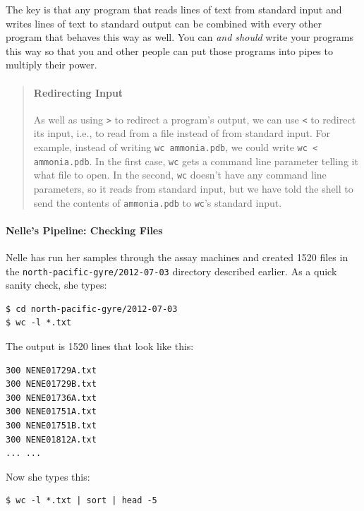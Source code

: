 \documentclass{book}
\begin{document}
The key is that any program that reads lines of text from standard input
and writes lines of text to standard output can be combined with every
other program that behaves this way as well. You can \emph{and should}
write your programs this way so that you and other people can put those
programs into pipes to multiply their power.

\begin{quote}
\mbox{}\paragraph{Redirecting Input}

As well as using \texttt{\textgreater{}} to redirect a program's output,
we can use \texttt{\textless{}} to redirect its input, i.e., to read
from a file instead of from standard input. For example, instead of
writing \texttt{wc ammonia.pdb}, we could write
\texttt{wc \textless{} ammonia.pdb}. In the first case, \texttt{wc} gets
a command line parameter telling it what file to open. In the second,
\texttt{wc} doesn't have any command line parameters, so it reads from
standard input, but we have told the shell to send the contents of
\texttt{ammonia.pdb} to \texttt{wc}'s standard input.
\end{quote}

\mbox{}\paragraph{Nelle's Pipeline: Checking Files}

Nelle has run her samples through the assay machines and created 1520
files in the \texttt{north-pacific-gyre/2012-07-03} directory described
earlier. As a quick sanity check, she types:

\begin{verbatim}
$ cd north-pacific-gyre/2012-07-03
$ wc -l *.txt
\end{verbatim}

The output is 1520 lines that look like this:

\begin{verbatim}
300 NENE01729A.txt
300 NENE01729B.txt
300 NENE01736A.txt
300 NENE01751A.txt
300 NENE01751B.txt
300 NENE01812A.txt
... ...
\end{verbatim}

Now she types this:

\begin{verbatim}
$ wc -l *.txt | sort | head -5
\end{verbatim}
\end{document}
